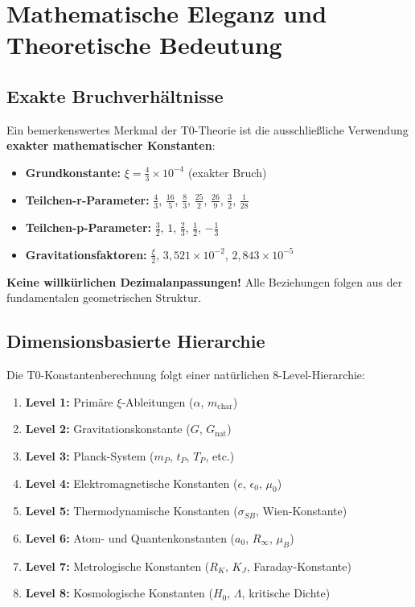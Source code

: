 \documentclass[11pt,a4paper]{article}
\begin{document}
	\section{Mathematische Eleganz und Theoretische Bedeutung}
	
	\subsection{Exakte Bruchverhältnisse}
	
	Ein bemerkenswertes Merkmal der T0-Theorie ist die ausschließliche Verwendung \textbf{exakter mathematischer Konstanten}:
	
	\begin{itemize}
		\item \textbf{Grundkonstante:} $\xi = \frac{4}{3} \times 10^{-4}$ (exakter Bruch)
		\item \textbf{Teilchen-r-Parameter:} $\frac{4}{3}$, $\frac{16}{5}$, $\frac{8}{3}$, $\frac{25}{2}$, $\frac{26}{9}$, $\frac{3}{2}$, $\frac{1}{28}$
		\item \textbf{Teilchen-p-Parameter:} $\frac{3}{2}$, $1$, $\frac{2}{3}$, $\frac{1}{2}$, $-\frac{1}{3}$
		\item \textbf{Gravitationsfaktoren:} $\frac{\xi}{2}$, $3{,}521 \times 10^{-2}$, $2{,}843 \times 10^{-5}$
	\end{itemize}
	
	\textcolor{t0green}{\textbf{Keine willkürlichen Dezimalanpassungen!}} Alle Beziehungen folgen aus der fundamentalen geometrischen Struktur.
	
	\subsection{Dimensionsbasierte Hierarchie}
	
	Die T0-Konstantenberechnung folgt einer natürlichen 8-Level-Hierarchie:
	
	\begin{enumerate}
		\item \textbf{Level 1:} Primäre $\xi$-Ableitungen ($\alpha$, $m_{\text{char}}$)
		\item \textbf{Level 2:} Gravitationskonstante ($G$, $G_{\text{nat}}$)
		\item \textbf{Level 3:} Planck-System ($m_P$, $t_P$, $T_P$, etc.)
		\item \textbf{Level 4:} Elektromagnetische Konstanten ($e$, $\epsilon_0$, $\mu_0$)
		\item \textbf{Level 5:} Thermodynamische Konstanten ($\sigma_{SB}$, Wien-Konstante)
		\item \textbf{Level 6:} Atom- und Quantenkonstanten ($a_0$, $R_\infty$, $\mu_B$)
		\item \textbf{Level 7:} Metrologische Konstanten ($R_K$, $K_J$, Faraday-Konstante)
		\item \textbf{Level 8:} Kosmologische Konstanten ($H_0$, $\Lambda$, kritische Dichte)
	\end{enumerate}
	
\end{document}
